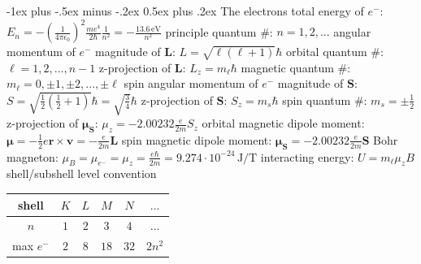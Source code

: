 \documentclass[10pt,landscape]{article}
\makeatletter
\renewcommand{\subsection}{\@startsection{subsection}{2}{0mm}%
                                {-1ex plus -.5ex minus -.2ex}%
                                {0.5ex plus .2ex}%
                                {\normalfont\normalsize\bfseries}}
\newcommand{\spc}{\hspace*{1em}}
\makeatother
\begin{document}
\begin{multicols*}{3}
\subsection{The electrons}
total energy of $e^-$:
$E_n=-(\frac{1}{4\pi\epsilon_0})^2\frac{me^4}{2\hbar}\frac{1}{n^2}=-\frac{13.6\,\textrm{eV}}{n^2}$
\newline
\spc principle quantum \#: $n=1,2,...$
\newline\newline
angular momentum of $e^-$
\newline
\spc magnitude of $\mathbf{L}$: $L=\sqrt{\ell(\ell+1)}\hbar$
\newline
\spc\spc orbital quantum \#: $\ell=1,2,...,n-1$
\newline
\spc z-projection of $\mathbf{L}$: $L_z=m_{\ell}\hbar$
\newline
\spc\spc magnetic quantum \#: $m_{\ell}=0,\pm 1,\pm 2, ..., \pm \ell$
\newline\newline
spin angular momentum of $e^-$
\newline
\spc magnitude of $\mathbf{S}$: $S=\sqrt{\tfrac{1}{2}(\tfrac{1}{2}+1)}\hbar=\sqrt{\tfrac{3}{4}}\hbar$
\newline
\spc z-projection of $\mathbf{S}$: $S_z=m_s\hbar$
\newline
\spc\spc spin quantum \#: $m_s=\pm\frac{1}{2}$
\newline
\spc z-projection of $\boldsymbol{\mu}_{\mathbf{S}}$: $\mu_z=-2.00232\frac{e}{2m}S_z$
\newline \newline
orbital magnetic dipole moment: $\boldsymbol{\mu}=-\frac{1}{2}e\mathbf{r}\times \mathbf{v}=-\frac{e}{2m}\mathbf{L}$
\newline
spin magnetic dipole moment: $\boldsymbol{\mu}_{\mathbf{S}}=-2.00232\frac{e}{2m}\mathbf{S}$
\newline
Bohr magneton: $\mu_B=\mu_{e^-}=\mu_z=\frac{e\hbar}{2m}=9.274\cdot 10^{-24}\,\textrm{J}/\textrm{T}$
\newline
interacting energy: $U=m_{\ell}\mu_zB$
\newline
\vfill \null
\columnbreak
shell/subshell level convention
\begin{center}
\begin{tabular}{ |c| c c c c c| } 
 \hline
  shell & $K$ & $L$ & $M$ & $N$ & $...$\\ 
  \hline
 $n$ & $1$ & $2$ & $3$ & $4$ & $...$\\
 \hline
 max $e^-$ & $2$ & $8$ & $18$ & $32$ & $2n^2$\\

\end{tabular}
\end{center}
\end{multicols*}
\end{document}
